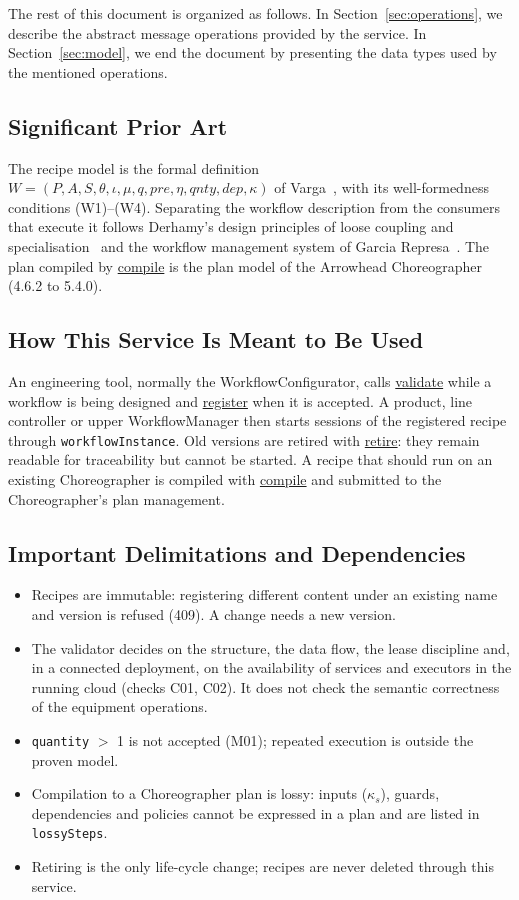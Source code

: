 \documentclass[a4paper]{arrowhead}
\newcommand{\oref}[1]{{\textcolor{ArrowheadBlue}{\hyperref[sec:operations:#1]{#1}}}}
\begin{document}
The rest of this document is organized as follows.
In Section~\ref{sec:operations}, we describe the abstract message operations provided by the service.
In Section~\ref{sec:model}, we end the document by presenting the data types used by the mentioned operations.

\subsection{Significant Prior Art}
The recipe model is the formal definition $W = (P, A, S, \theta, \iota, \mu, q, pre, \eta, qnty, dep, \kappa)$
of Varga~\cite{varga2026}, with its well-formedness conditions (W1)--(W4). Separating the workflow description from the
consumers that execute it follows Derhamy's design principles of loose coupling and specialisation~\cite{derhamy2018}
and the workflow management system of Garcia Represa~\cite{represa2022}. The plan compiled by \oref{compile} is the
plan model of the Arrowhead Choreographer (4.6.2 to 5.4.0).

\subsection{How This Service Is Meant to Be Used}
An engineering tool, normally the WorkflowConfigurator, calls \oref{validate} while a workflow is being
designed and \oref{register} when it is accepted. A product, line controller or upper WorkflowManager then starts
sessions of the registered recipe through \texttt{workflowInstance}. Old versions are retired with \oref{retire}: they
remain readable for traceability but cannot be started. A recipe that should run on an existing Choreographer is
compiled with \oref{compile} and submitted to the Choreographer's plan management.

\subsection{Important Delimitations and Dependencies}
\label{sec:delimitations}
\begin{itemize}
\item Recipes are immutable: registering different content under an existing name and version is refused (409). A change needs a new version.
\item The validator decides on the structure, the data flow, the lease discipline and, in a connected deployment, on the availability of services and executors in the running cloud (checks C01, C02). It does not check the semantic correctness of the equipment operations.
\item \texttt{quantity} $>$ 1 is not accepted (M01); repeated execution is outside the proven model.
\item Compilation to a Choreographer plan is lossy: inputs ($\kappa_s$), guards, dependencies and policies cannot be expressed in a plan and are listed in \texttt{lossySteps}.
\item Retiring is the only life-cycle change; recipes are never deleted through this service.
\end{itemize}
\end{document}

